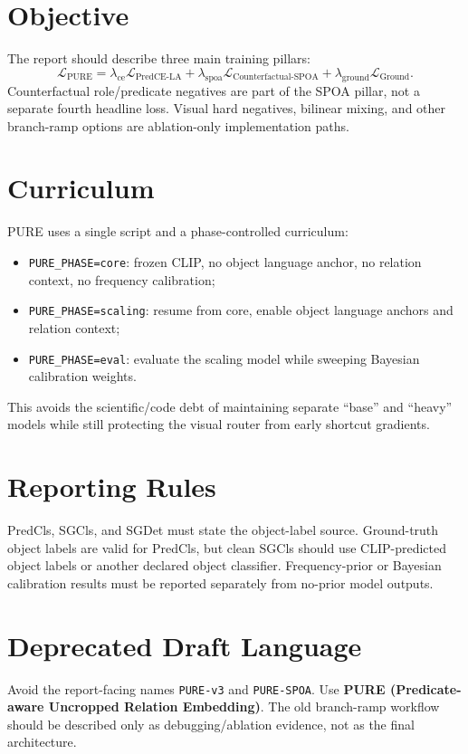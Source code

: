 \documentclass[11pt]{article}
\begin{document}
\section{Objective}
The report should describe three main training pillars:
\begin{equation}
\mathcal{L}_{\mathrm{PURE}} =
\lambda_{\mathrm{ce}}\mathcal{L}_{\mathrm{PredCE\text{-}LA}}+
\lambda_{\mathrm{spoa}}\mathcal{L}_{\mathrm{Counterfactual\text{-}SPOA}}+
\lambda_{\mathrm{ground}}\mathcal{L}_{\mathrm{Ground}}.
\end{equation}
Counterfactual role/predicate negatives are part of the SPOA pillar, not a separate fourth headline loss. Visual hard negatives, bilinear mixing, and other branch-ramp options are ablation-only implementation paths.

\section{Curriculum}
PURE uses a single script and a phase-controlled curriculum:
\begin{itemize}[leftmargin=1.5em]
  \item \texttt{PURE\_PHASE=core}: frozen CLIP, no object language anchor, no relation context, no frequency calibration;
  \item \texttt{PURE\_PHASE=scaling}: resume from core, enable object language anchors and relation context;
  \item \texttt{PURE\_PHASE=eval}: evaluate the scaling model while sweeping Bayesian calibration weights.
\end{itemize}
This avoids the scientific/code debt of maintaining separate ``base'' and ``heavy'' models while still protecting the visual router from early shortcut gradients.

\section{Reporting Rules}
PredCls, SGCls, and SGDet must state the object-label source. Ground-truth object labels are valid for PredCls, but clean SGCls should use CLIP-predicted object labels or another declared object classifier. Frequency-prior or Bayesian calibration results must be reported separately from no-prior model outputs.

\section{Deprecated Draft Language}
Avoid the report-facing names \texttt{PURE-v3} and \texttt{PURE-SPOA}. Use \textbf{PURE (Predicate-aware Uncropped Relation Embedding)}. The old branch-ramp workflow should be described only as debugging/ablation evidence, not as the final architecture.



\end{document}
